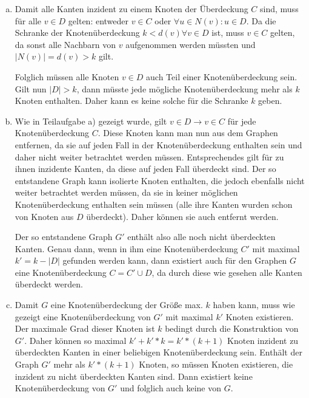 \documentclass[12pt,a4paper]{article}
\begin{document}
\begin{enumerate}[a)] 
	
	\item Damit alle Kanten inzident zu einem Knoten der Überdeckung \(C\) sind, muss für alle \(v \in D\) gelten: entweder \(v \in C\) oder \(\forall u \in N(v): u \in D\). Da die Schranke der Knotenüberdeckung \(k < d(v) \forall v \in D\) ist, muss \textbf{\(v \in C\)} gelten, da sonst alle Nachbarn von \(v\) aufgenommen werden müssten und \(|N(v)| = d(v) > k\) gilt. 

	Folglich müssen alle Knoten \(v \in D\) auch Teil einer Knotenüberdeckung sein. Gilt nun \(|D| > k\), dann müsste jede mögliche Knotenüberdeckung mehr als \(k\) Knoten enthalten. Daher kann es keine solche für die Schranke \(k\) geben.

	\item Wie in Teilaufgabe a) gezeigt wurde, gilt \(v \in D \rightarrow v \in C\) für jede Knotenüberdeckung \(C\). Diese Knoten kann man nun aus dem Graphen entfernen, da sie auf jeden Fall in der Knotenüberdeckung enthalten sein  und daher nicht weiter betrachtet werden müssen. Entsprechendes gilt für zu ihnen inzidente Kanten, da diese auf jeden Fall überdeckt sind. Der so entstandene Graph kann isolierte Knoten enthalten, die jedoch ebenfalls nicht weiter betrachtet werden müssen, da sie in keiner möglichen Knotenüberdeckung enthalten sein müssen (alle ihre Kanten wurden schon von Knoten aus \(D\) überdeckt). Daher können sie auch entfernt werden. 

	Der so entstandene Graph \(G'\) enthält also alle noch nicht überdeckten Kanten. Genau dann, wenn in ihm eine Knotenüberdeckung \(C'\) mit maximal \(k' = k - |D|\) gefunden werden kann, dann existiert auch für den Graphen \(G\) eine Knotenüberdeckung \(C = C' \cup D\), da durch diese wie gesehen alle Kanten überdeckt werden.

	\item Damit \(G\) eine Knotenüberdeckung der Größe max. \(k\) haben kann, muss wie gezeigt eine Knotenüberdeckung von \(G'\) mit maximal \(k'\) Knoten existieren. Der maximale Grad dieser Knoten ist \(k\) bedingt durch die Konstruktion von \(G'\). Daher können so maximal \(k' + k' * k = k'*(k+1)\) Knoten inzident zu überdeckten Kanten in einer beliebigen Knotenüberdeckung sein. Enthält der Graph \(G'\) mehr als \(k'*(k+1)\) Knoten, so müssen Knoten existieren, die inzident zu nicht überdeckten Kanten sind. Dann existiert keine Knotenüberdeckung von \(G'\) und folglich auch keine von \(G\).


\end{enumerate}
\end{document}
